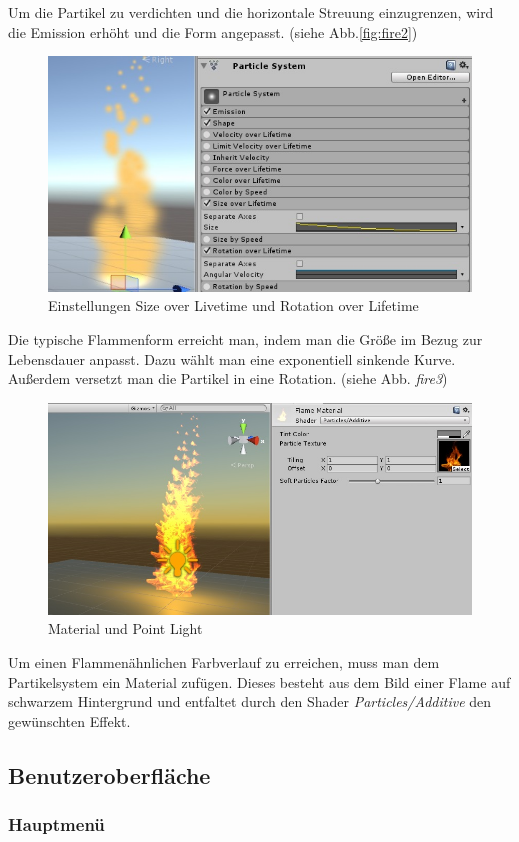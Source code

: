Um die Partikel zu verdichten und die horizontale Streuung einzugrenzen, wird die Emission erhöht und die Form angepasst. (siehe Abb.\ref{fig:fire2}) 

\begin{figure}[h!]
\centering
\includegraphics[width=0.95\linewidth]{Abbildungen/Unity/Fire/fire3}
\caption{Einstellungen Size over Livetime und Rotation over Lifetime}
\label{fig:fire3}
\end{figure}

Die typische Flammenform erreicht man, indem man die Größe im Bezug zur Lebensdauer anpasst. Dazu wählt man eine exponentiell sinkende Kurve. Außerdem versetzt man die Partikel in eine Rotation. (siehe Abb. \textit{fire3})

\begin{figure}[h!]
\centering
\includegraphics[width=0.95\linewidth]{Abbildungen/Unity/Fire/fire4}
\caption{Material und Point Light}
\label{fig:fire4}
\end{figure}

Um einen Flammenähnlichen Farbverlauf zu erreichen, muss man dem Partikelsystem ein Material zufügen. Dieses besteht aus dem Bild einer Flame auf schwarzem Hintergrund und entfaltet durch den Shader \textit{Particles/Additive} den gewünschten Effekt.

\newpage

\subsection{Benutzeroberfläche}
\subsubsection{Hauptmenü}
\subsubsection{}






 

